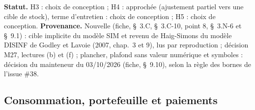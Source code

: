 \documentclass[11pt,a4paper]{article}
\begin{document}
\begin{proposee}
\textbf{Statut.} H3 : choix de conception ; H4 : approchée (ajustement partiel vers une cible de stock), terme d'entretien : choix de conception ; H5 : choix de conception. \textbf{Provenance.} Nouvelle (fiche, \S~3.C, \S~3.C-10, point 8, \S~3.N-6 et \S~9.1) : cible implicite du modèle SIM et revenu de Haig-Simons du modèle DISINF de Godley et Lavoie (2007, chap.~3 et 9), lus par reproduction ; décision M27, lectures (b) et (f) ; plancher, plafond sans valeur numérique et symboles : décision du mainteneur du 03/10/2026 (fiche, \S~9.10), selon la règle des bornes de l'issue \#38.
\end{proposee}

\subsection{Consommation, portefeuille et paiements}
\label{sec:menages-consommation}
\end{document}
